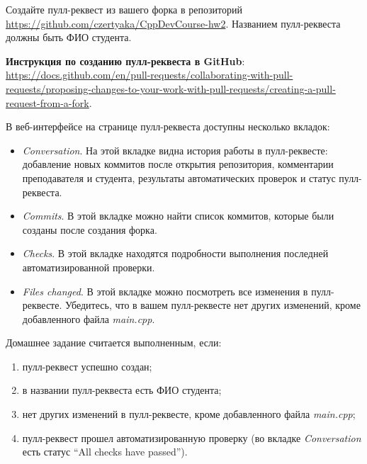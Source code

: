 \documentclass[14pt]{extarticle}
\begin{document}
    Создайте пулл-реквест из вашего форка в репозиторий
    \url{https://github.com/czertyaka/CppDevCourse-hw2}.
    Названием пулл-реквеста должны быть ФИО студента.

    \begin{tcolorbox}
        \textbf{Инструкция по созданию пулл-реквеста в GitHub}: \\
        \url{https://docs.github.com/en/pull-requests/collaborating-with-pull-requests/proposing-changes-to-your-work-with-pull-requests/creating-a-pull-request-from-a-fork}.
    \end{tcolorbox}

    В веб-интерфейсе на странице пулл-реквеста доступны несколько вкладок:

    \begin{itemize}

        \item \textit{Conversation}. На этой вкладке видна история работы в пулл-реквесте:
            добавление новых коммитов после открытия репозитория, комментарии
            преподавателя и студента, результаты автоматических проверок и статус
            пулл-реквеста.

        \item \textit{Commits}. В этой вкладке можно найти список коммитов, которые
            были созданы после создания форка.

        \item \textit{Checks}. В этой вкладке находятся подробности выполнения
            последней автоматизированной проверки.

        \item \textit{Files changed}. В этой вкладке можно посмотреть все изменения
            в пулл-реквесте.
            Убедитесь, что в вашем пулл-реквесте нет других изменений, кроме
            добавленного файла \textit{main.cpp}.

    \end{itemize}

    Домашнее задание считается выполненным, если:

    \begin{enumerate}

        \item пулл-реквест успешно создан;

        \item в названии пулл-реквеста есть ФИО студента;

        \item нет других изменений в пулл-реквесте, кроме добавленного файла
            \textit{main.cpp};

        \item пулл-реквест прошел автоматизированную проверку (во вкладке
            \textit{Conversation} есть статус \enquote{All checks have passed}).

    \end{enumerate}
\end{document}
